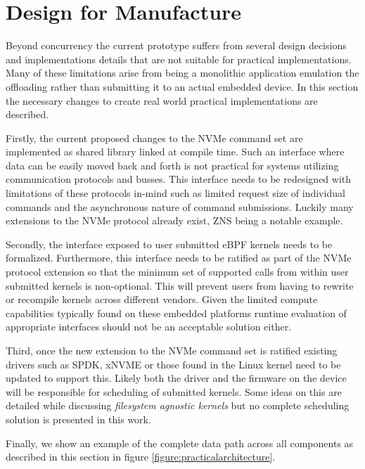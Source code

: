 \section{Design for Manufacture}

Beyond concurrency the current prototype suffers from several design decisions
and implementations details that are not suitable for practical implementations.
Many of these limitations arise from being a monolithic application emulation
the offloading rather than submitting it to an actual embedded device. In this
section the necessary changes to create real world practical implementations are
described.

Firstly, the current proposed changes to the NVMe command set are implemented as
shared library linked at compile time. Such an interface where data can be
easily moved back and forth is not practical for systems utilizing communication
protocols and busses. This interface needs to be redesigned with limitations of
these protocols in-mind such as limited request size of individual commands and
the asynchronous nature of command submissions. Luckily many extensions to
the NVMe protocol already exist, ZNS being a notable example.

Secondly, the interface exposed to user submitted eBPF kernels needs to be
formalized. Furthermore, this interface needs to be ratified as part of the NVMe
protocol extension so that the minimum set of supported calls from within 
user submitted kernels is non-optional. This will prevent users from having to
rewrite or recompile kernels across different vendors. Given the limited compute
capabilities typically found on these embedded platforms runtime evaluation of
appropriate interfaces should not be an acceptable solution either.

Third, once the new extension to the NVMe command set is ratified existing
drivers such as SPDK, xNVME or those found in the Linux kernel need to be
updated to support this. Likely both the driver and the firmware on the device
will be responsible for scheduling of submitted kernels. Some ideas on this are
detailed while discussing \textit{filesystem agnostic kernels} but no complete
scheduling solution is presented in this work.

Finally, we show an example of the complete data path across all components as
described in this section in figure \ref{figure:practicalarchitecture}.

